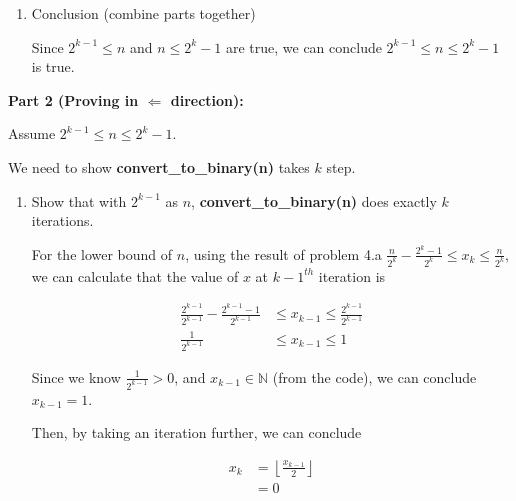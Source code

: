 \documentclass[12pt]{article}
\begin{document}
\begin{enumerate}[a.]
\begin{mdframed}
\begin{enumerate}[1.]
            \item Conclusion (combine parts together)

            \begin{mdframed}
            Since $2^{k-1} \leq n$ and $n \leq 2^k-1$ are true, we can conclude
            $2^{k-1} \leq n \leq 2^k-1$ is true.
            \end{mdframed}
        \end{enumerate}

        \bigskip

        \textbf{Part 2 (Proving in $\Leftarrow$ direction):}

        \bigskip

        Assume $2^{k-1} \leq n \leq 2^k - 1$.

        \bigskip

        We need to show \textbf{convert\_to\_binary(n)} takes $k$ step.

        \bigskip

        \begin{enumerate}[1.]
            \item Show that with $2^{k-1}$ as $n$, \textbf{convert\_to\_binary(n)}
            does exactly $k$ iterations.

            \bigskip

            \begin{mdframed}
            For the lower bound of $n$, using the result of problem 4.a $\frac{n}{2^k} - \frac{2^k - 1}{2^k}
            \leq x_k \leq \frac{n}{2^k}$, we can calculate that the value of $x$
            at $k-1^{th}$ iteration is

            \bigskip

            \begin{align}
                \frac{2^{k-1}}{2^{k-1}} - \frac{2^{k-1} - 1}{2^{k-1}} &\leq x_{k-1} \leq \frac{2^{k-1}}{2^{k-1}}\\
                \frac{1}{2^{k-1}} &\leq x_{k-1} \leq 1
            \end{align}

            \bigskip

            Since we know $\frac{1}{2^{k-1}} > 0$, and $x_{k-1} \in \mathbb{N}$ (from the code),
            we can conclude $x_{k-1} = 1$.

            \bigskip

            Then, by taking an iteration further, we can conclude

            \begin{align}
                x_k &= \left\lfloor \frac{x_{k-1}}{2} \right\rfloor\\
                &= 0
            \end{align}


\end{mdframed}
\end{enumerate}
\end{mdframed}
\end{enumerate}
\end{document}
